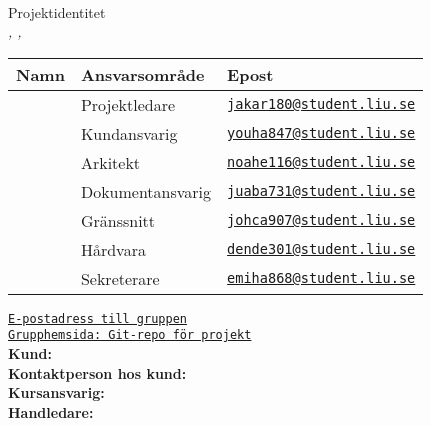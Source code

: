 \documentclass[kravspec/krav.tex]{subfiles}
\newenvironment{projektidentitet}{%
{\ }\vspace{30mm}
\renewcommand{\arraystretch}{2}
\begin{center}
  {\huge Projektidentitet\\[1ex]}
  \textsl{\VARgruppnummer, \LIPSdatum, \VARprojekttitel}\\[1cm]
    \begin{tabular}{lp{60mm}l}
      \hline
      \textbf{Namn} &
      \textbf{Ansvarsområde} &
      \textbf{Epost} \\
	\hline
      }%
      {%
      \hline
    \end{tabular}
\end{center}
}
\newcommand{\gruppmedlem}[3]{{#1} & {#2} & {#3} \\}
\begin{document}
\thispagestyle{empty}

\begin{projektidentitet}
\gruppmedlem{\VARprojektledare}{Projektledare}{\href{mailto:jakar180@student.liu.se}{\texttt{jakar180@student.liu.se}}}
\gruppmedlem{\VARkundansvarig}{Kundansvarig}{\href{mailto:youha847@student.liu.se}{\texttt{youha847@student.liu.se}}}
\gruppmedlem{\VARarkitekt}{Arkitekt}{\href{mailto:noahe116@student.liu.se}{\texttt{noahe116@student.liu.se}}}
\gruppmedlem{\VARdokumentansvarig}{Dokumentansvarig}{\href{mailto:juaba731@student.liu.se}{\texttt{juaba731@student.liu.se}}}

\gruppmedlem{\VARgranssnitt}{Gränssnitt}{\href{mailto:johca907@student.liu.se}{\texttt{johca907@student.liu.se}}}
\gruppmedlem{\VARhardware}{Hårdvara}{\href{mailto:dende301@student.liu.se}{\texttt{dende301@student.liu.se}}}
\gruppmedlem{\VARsekreterare}{Sekreterare}{\href{mailto:emiha868@student.liu.se}{\texttt{emiha868@student.liu.se}}}
\end{projektidentitet}

\begin{center}
\vspace{0.5cm}
{\href{mailto:jakar180@student.liu.se, youha847@student.liu.se, noahe116@student.liu, juaba731@student.liu.se, johca907@student.liu.se, dende301@student.liu.se,emiha868@student.liu.se}{
\texttt{E-postadress till gruppen}}}\\

{\href{\VARgrupphemsida}{
\texttt{Grupphemsida: Git-repo för projekt}}}\\[1cm]

{\textbf{Kund:} \VARbestallare}\\[0.5ex]
{\textbf{Kontaktperson hos kund:} \VARkundansvarig}\\[1cm]

{\textbf{Kursansvarig:} \VARkursansvarig}\\[1ex]
{\textbf{Handledare:} \VARhandledare}

\end{center}
\newpage
\end{document}
